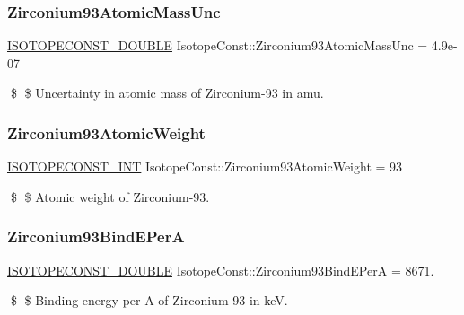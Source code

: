 \subsubsection{\texorpdfstring{Zirconium93\+Atomic\+Mass\+Unc}{Zirconium93AtomicMassUnc}}
{\footnotesize\ttfamily \mbox{\hyperlink{group___isotope_const-_macros_ga8f45a7272ce02c0b4c65c44636ed719a}{I\+S\+O\+T\+O\+P\+E\+C\+O\+N\+S\+T\+\_\+\+D\+O\+U\+B\+LE}} Isotope\+Const\+::\+Zirconium93\+Atomic\+Mass\+Unc = 4.\+9e-\/07}

\$ \$ Uncertainty in atomic mass of Zirconium-\/93 in amu. \mbox{\label{group___isotope_const-_zirconium-_zr93_ga35c76584b50e70e7474c81365217e103}} 
\subsubsection{\texorpdfstring{Zirconium93\+Atomic\+Weight}{Zirconium93AtomicWeight}}
{\footnotesize\ttfamily \mbox{\hyperlink{group___isotope_const-_macros_ga5f18360b3e99483a35c32d789e62621c}{I\+S\+O\+T\+O\+P\+E\+C\+O\+N\+S\+T\+\_\+\+I\+NT}} Isotope\+Const\+::\+Zirconium93\+Atomic\+Weight = 93}

\$ \$ Atomic weight of Zirconium-\/93. \mbox{\label{group___isotope_const-_zirconium-_zr93_ga6f243e5b7d10951a4b6936daf0d4c2f9}} 
\subsubsection{\texorpdfstring{Zirconium93\+Bind\+E\+PerA}{Zirconium93BindEPerA}}
{\footnotesize\ttfamily \mbox{\hyperlink{group___isotope_const-_macros_ga8f45a7272ce02c0b4c65c44636ed719a}{I\+S\+O\+T\+O\+P\+E\+C\+O\+N\+S\+T\+\_\+\+D\+O\+U\+B\+LE}} Isotope\+Const\+::\+Zirconium93\+Bind\+E\+PerA = 8671.}

\$ \$ Binding energy per A of Zirconium-\/93 in keV. \mbox{\label{group___isotope_const-_zirconium-_zr93_gaa3a2aaccef71b7e71e2211f1ce66abc3}} 
